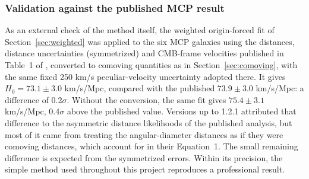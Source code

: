\documentclass[11pt]{article}
\begin{document}
\subsubsection{Validation against the published MCP result}
\label{sec:validation}
As an external check of the method itself, the weighted origin-forced fit of Section~\ref{sec:weighted} was applied to the six MCP galaxies using the distances, distance uncertainties (symmetrized) and CMB-frame velocities published in Table~1 of \citet{pesce2020}, converted to comoving quantities as in Section~\ref{sec:comoving}, with the same fixed 250 km/s peculiar-velocity uncertainty adopted there. It gives $H_0 = 73.1 \pm 3.0$ km/s/Mpc, compared with the published $73.9 \pm 3.0$ km/s/Mpc: a difference of 0.2$\sigma$. Without the conversion, the same fit gives $75.4 \pm 3.1$ km/s/Mpc, 0.4$\sigma$ above the published value. Versions up to 1.2.1 attributed that difference to the asymmetric distance likelihoods of the published analysis, but most of it came from treating the angular-diameter distances as if they were comoving distances, which \citet{pesce2020} account for in their Equation~1. The small remaining difference is expected from the symmetrized errors. Within its precision, the simple method used throughout this project reproduces a professional result.
\end{document}
